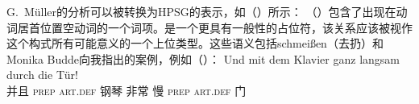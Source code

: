 \begin{exe}
\begin{xlist}[iv.]
\begin{exe}
\begin{xlist}[iv.]
G.\ Müller的分析可以被转换为HPSG的表示，如（）所示：
\ea
{}
\z
（）包含了出现在动词居首位置空动词的一个词项。是一个更具有一般性的占位符，该关系应该被视作这个构式所有可能意义的一个上位类型。这些语义包括schmeißen（去扔）和Monika Budde向我指出的案例，例如（）：
\ea
\label{Klavier-durch-die-Tuer}
\gll Und mit dem Klavier ganz langsam durch die Tür!\\
	 并且 \textsc{prep} \textsc{art}.\textsc{def} 钢琴 非常 慢 \textsc{prep} \textsc{art}.\textsc{def} 门\\

\end{xlist}
\end{exe}
\end{xlist}
\end{exe}
